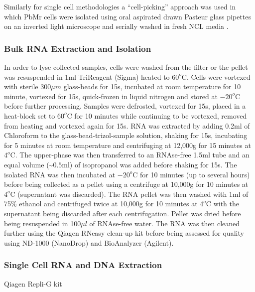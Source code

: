 Similarly for single cell methodologies a ``cell-picking'' approach was used in which
PbMr cells were isolated using oral aspirated drawn Pasteur glass pipettes on 
an inverted light microscope and serially washed in fresh NCL media \citep{Garcia-Cuetos2012}.

\subsubsection{Bulk RNA Extraction and Isolation}
In order to lyse collected samples, cells were washed from the filter or the 
pellet was resuspended in 1ml TriReagent (Sigma) heated to $60^{o}$C. 
Cells were vortexed with sterile 300$\mu m$ glass-beads for 15s, incubated at 
room temperature for 10 minute, vortexed for 15s, quick-frozen in liquid 
nitrogen and stored at $-20^{o}$C before further processing.  
Samples were defrosted, vortexed for 15s, placed in a heat-block set 
to $60^{o}$C for 10 minutes while continuing to be vortexed, removed from 
heating and vortexed again for 15s.  
RNA was extracted by adding 0.2ml of Chloroform to the glass-bead-trizol-sample 
solution, shaking for 15s, incubating for 5 minutes at room temperature and 
centrifuging at 12,000g for 15 minutes at $4^{o}$C.  
The upper-phase was then transferred to an RNAse-free 1.5ml tube and an 
equal volume (\textasciitilde$0.5$ml) of isopropanol was added before shaking for 15s.  
The isolated RNA was then incubated at $-20^{o}$C for 10 minutes 
(up to several hours) before being collected as a pellet using a centrifuge at 
10,000g for 10 minutes at $4^{o}$C (supernatant was discarded). 
The RNA pellet was then washed with 1ml of 75\% ethanol and centrifuged 
twice at 10,000g for 10 minutes at $4^{o}$C with the supernatant being 
discarded after each centrifugation.  
Pellet was dried before being resuspended in 100$\mu l$ of RNAse-free water.  
The RNA was then cleaned further using the Qiagen RNeasy clean-up kit 
before being assessed for quality using ND-1000 (NanoDrop) and BioAnalyzer (Agilent).

\subsubsection{Single Cell RNA and DNA Extraction}
Qiagen Repli-G kit



